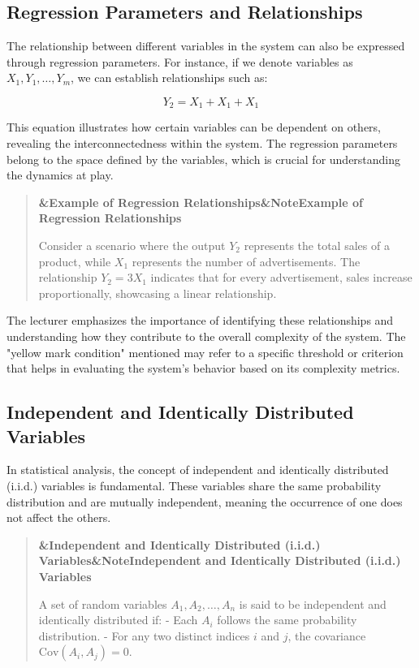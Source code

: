 \documentclass[a4paper]{article}
\newcommand{\boxheading}[1]{%
  \par\smallskip
  \noindent\textbf{\ifx&#1&Note\else#1\fi}\par
  \smallskip
}
\newenvironment{defbox}[1][]{%
  \begin{quote}\color{green!40!black}\boxheading{#1}\normalcolor
}{\end{quote}}
\newenvironment{exbox}[1][]{%
  \begin{quote}\color{brown!70!black}\boxheading{#1}\normalcolor
}{\end{quote}}
\begin{document}
\subsection{Regression Parameters and Relationships}
The relationship between different variables in the system can also be expressed through regression parameters. For instance, if we denote variables as \( X_1, Y_1, \ldots, Y_m \), we can establish relationships such as:

\begin{equation}
Y_2 = X_1 + X_1 + X_1
\end{equation}

This equation illustrates how certain variables can be dependent on others, revealing the interconnectedness within the system. The regression parameters belong to the space defined by the variables, which is crucial for understanding the dynamics at play.

\begin{exbox}[Example of Regression Relationships]
Consider a scenario where the output \( Y_2 \) represents the total sales of a product, while \( X_1 \) represents the number of advertisements. The relationship \( Y_2 = 3X_1 \) indicates that for every advertisement, sales increase proportionally, showcasing a linear relationship.
\end{exbox}

The lecturer emphasizes the importance of identifying these relationships and understanding how they contribute to the overall complexity of the system. The "yellow mark condition" mentioned may refer to a specific threshold or criterion that helps in evaluating the system's behavior based on its complexity metrics.

\subsection{Independent and Identically Distributed Variables}
In statistical analysis, the concept of independent and identically distributed (i.i.d.) variables is fundamental. These variables share the same probability distribution and are mutually independent, meaning the occurrence of one does not affect the others. 

\begin{defbox}[Independent and Identically Distributed (i.i.d.) Variables]
A set of random variables \( A_1, A_2, \ldots, A_n \) is said to be independent and identically distributed if:
- Each \( A_i \) follows the same probability distribution.
- For any two distinct indices \( i \) and \( j \), the covariance \( \text{Cov}(A_i, A_j) = 0 \).
\end{defbox}
\end{document}
